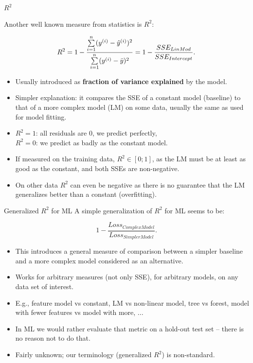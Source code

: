 \documentclass[11pt,compress,t,notes=noshow, xcolor=table]{beamer}
\begin{document}
\begin{vbframe}{$R^2$}
\begin{small}
Another well known measure from statistics is $R^2$:

\[
R^2 = 1 - \frac{\sum\limits_{i=1}^n (y^{(i)} - \hat{y}^{(i)})^2}{\sum\limits_{i=1}^n (y^{(i)} - \bar{y})^2} = 1 - \frac{SSE_{LinMod}}{SSE_{Intercept}}.
\]

\begin{itemize}
  \item Usually introduced as \textbf{fraction of variance explained} by the 
  model.
  \item Simpler explanation: it compares the SSE of a constant model (baseline) 
  to that of a more complex model (LM) on some data, usually the same as used 
  for model fitting.
  \item $R^2=1$: all residuals are 0, we predict perfectly, \\
  $R^2=0$: we predict as badly as the constant model.
  \item If measured on the training data, $R^2 \in [0;1]$, as the LM must be at least as good as the constant, and both SSEs are non-negative.
  \item On other data $R^2$ can even be negative as there is no guarantee that the LM generalizes better than a constant (overfitting).
\end{itemize}
\end{small}
\end{vbframe}


\begin{vbframe}{Generalized $R^2$ for ML}
A simple generalization of $R^2$ for ML seems to be:

\[
1 - \frac{Loss_{ComplexModel}}{Loss_{SimplerModel}}.
\]

\begin{itemize}
   \item This introduces a general measure of comparison between a simpler 
   baseline and a more complex model considered as an alternative.
  \item Works for arbitrary measures (not only SSE), for arbitrary models, on 
  any data set of interest.
  \item E.g., feature model vs constant, LM vs non-linear model, tree vs forest, 
  model with fewer features vs model with more, ...
  \item In ML we would rather evaluate that metric on a hold-out test set -- 
  there is no reason not to do that.
  \item Fairly unknown; our terminology (generalized $R^2$) is non-standard.
\end{itemize}

\end{vbframe}
\end{document}
